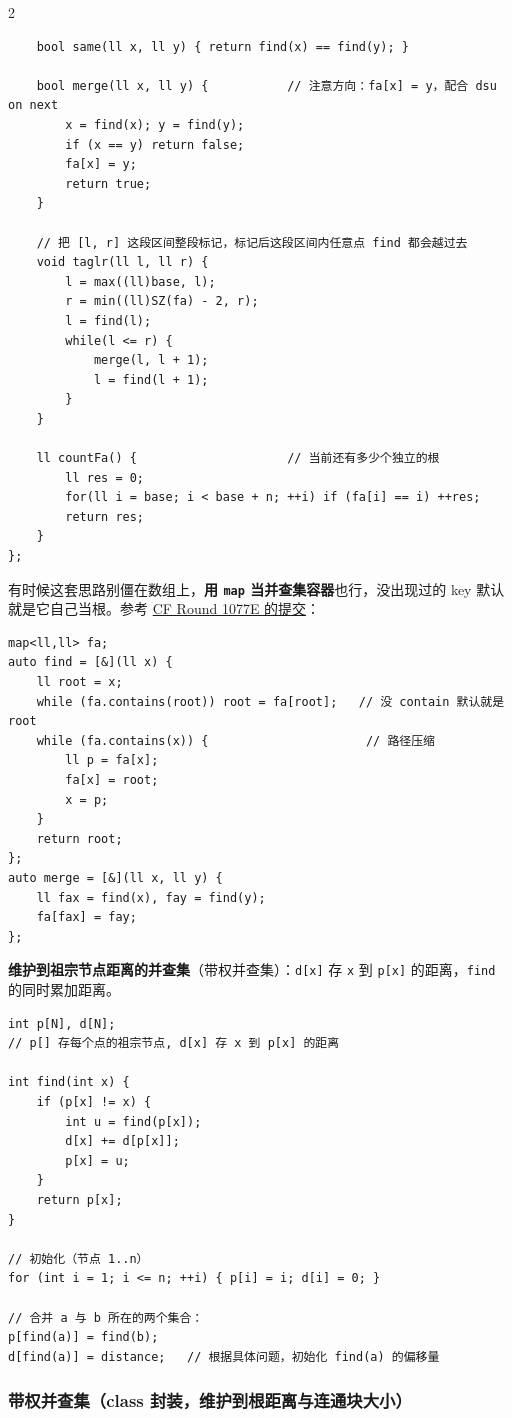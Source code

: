 \begin{multicols*}{2}
\begin{verbatim}
    bool same(ll x, ll y) { return find(x) == find(y); }

    bool merge(ll x, ll y) {           // 注意方向：fa[x] = y，配合 dsu on next
        x = find(x); y = find(y);
        if (x == y) return false;
        fa[x] = y;
        return true;
    }

    // 把 [l, r] 这段区间整段标记，标记后这段区间内任意点 find 都会越过去
    void taglr(ll l, ll r) {
        l = max((ll)base, l);
        r = min((ll)SZ(fa) - 2, r);
        l = find(l);
        while(l <= r) {
            merge(l, l + 1);
            l = find(l + 1);
        }
    }

    ll countFa() {                     // 当前还有多少个独立的根
        ll res = 0;
        for(ll i = base; i < base + n; ++i) if (fa[i] == i) ++res;
        return res;
    }
};
		\end{verbatim}

		有时候这套思路别僵在数组上，\textbf{用 \texttt{map} 当并查集容器}也行，没出现过的 key 默认就是它自己当根。参考 \href{https://codeforces.com/contest/2157/submission/355136647}{CF Round 1077E 的提交}：

		\begin{verbatim}
map<ll,ll> fa;
auto find = [&](ll x) {
    ll root = x;
    while (fa.contains(root)) root = fa[root];   // 没 contain 默认就是 root
    while (fa.contains(x)) {                      // 路径压缩
        ll p = fa[x];
        fa[x] = root;
        x = p;
    }
    return root;
};
auto merge = [&](ll x, ll y) {
    ll fax = find(x), fay = find(y);
    fa[fax] = fay;
};
		\end{verbatim}

		\textbf{维护到祖宗节点距离的并查集}（带权并查集）：\texttt{d[x]} 存 \texttt{x} 到 \texttt{p[x]} 的距离，\texttt{find} 的同时累加距离。

		\begin{verbatim}
int p[N], d[N];
// p[] 存每个点的祖宗节点, d[x] 存 x 到 p[x] 的距离

int find(int x) {
    if (p[x] != x) {
        int u = find(p[x]);
        d[x] += d[p[x]];
        p[x] = u;
    }
    return p[x];
}

// 初始化（节点 1..n）
for (int i = 1; i <= n; ++i) { p[i] = i; d[i] = 0; }

// 合并 a 与 b 所在的两个集合：
p[find(a)] = find(b);
d[find(a)] = distance;   // 根据具体问题，初始化 find(a) 的偏移量
		\end{verbatim}


		\subsubsection{带权并查集（class 封装，维护到根距离与连通块大小）}


\end{multicols*}
